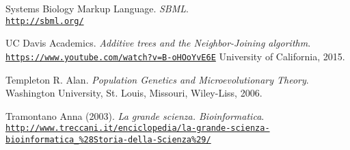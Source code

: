 \documentclass[twoside,openright,titlepage,fleqn,
,	headinclude,12pt,a4paper,BCOR5mm,footinclude,table]{scrbook}
\newcommand{\?}{'\-\nobreak\hspace{0pt}}
\begin{document}
\begin{thebibliography}{60}
Systems Biology Markup Language.\newline
\textit{SBML}.
\\\texttt{\url{http://sbml.org/}}

UC Davis Academics.\newline
\textit{Additive trees and the Neighbor-Joining algorithm}.
\\\texttt{\url{https://www.youtube.com/watch?v=B-oHOoYvE6E}}\newline
University of California, 2015.

Templeton R. Alan.\newline
\textit{Population Genetics and Microevolutionary Theory}.\newline
Washington University, St. Louis, Missouri, Wiley-Liss, 2006.

Tramontano Anna (2003).\newline
\textit{La grande scienza. Bioinformatica}.
\\\texttt{\url{http://www.treccani.it/enciclopedia/la-grande-scienza-bioinformatica_\%28Storia-della-Scienza\%29/}}

\end{thebibliography}


\end{document}
